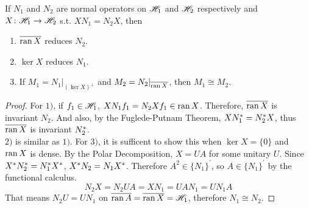 \documentclass[a4paper,11pt]{report}
\begin{document}
\begin{prop}
	If $N_1$ and $N_2$ are normal operators on $\mathscr{H}_1$ and $\mathscr{H}_2$ respectively and $X \colon \mathscr{H}_1 \rightarrow \mathscr{H}_2$ s.t. $XN_1 = N_2X$, then 
	\begin{enumerate}[label=\arabic*)]
		\item $\overline{\operatorname{ran}{X}}$ reduces $N_2$.
		\item $\ker{X}$ reduces $N_1$.
		\item If $M_1 = N_1|_{(\ker{X})^{\bot}}$ and $M_2 = N_2|_{\overline{\operatorname{ran}{X}}}$, then $M_1 \cong M_2$.
	\end{enumerate}
\end{prop}
\begin{proof}
	For $1)$, if $f_1 \in \mathscr{H}_1$, $XN_1f_1 = N_2Xf_1 \in \operatorname{ran}{X}$. Therefore, $\overline{\operatorname{ran}{X}}$ is invariant $N_2$. And also, by the Fuglede-Putnam Theorem, $XN_1^{*} = N_2^{*}X$, thus $\overline{\operatorname{ran}{X}}$ is invariant $N_2^{*}$.\\
	$2)$ is similar as $1)$.
	For $3)$, it is sufficent to show this when $\ker{X}=\{0\}$ and $\operatorname{ran}{X}$ is dense. By the Polar Decomposition, $X=UA$ for some unitary $U$. Since $X^{*}N_2^{*} = N_1^{*}X^{*}$, $X^{*}N_2 = N_1X^{*}$. Therefore $A^2 \in \{N_1\}^{'}$, so $A \in \{N_1\}^{'}$ by the functional calculus.
	\begin{equation*}
		N_2X = N_2UA= XN_1 = UAN_1 = UN_1A
	\end{equation*}
	That means $N_2U=UN_1$ on $\overline{\operatorname{ran}{A}} = \overline{\operatorname{ran}{X}} = \mathscr{H}_1$, therefore $N_1 \cong N_2$.
\end{proof}
\end{document}
